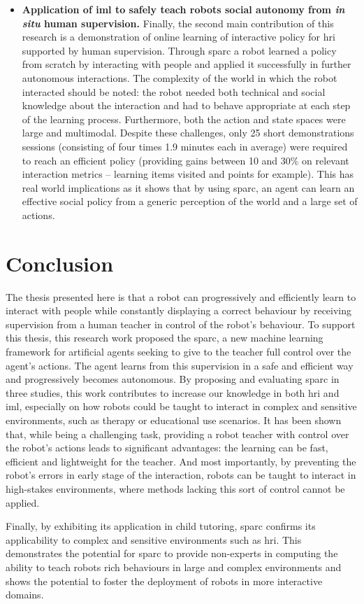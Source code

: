 \begin{itemize}
	\item \textbf{Application of \gls{iml} to safely teach robots social autonomy from \textit{in situ} human supervision.} Finally, the second main contribution of this research is a demonstration of online learning of interactive policy for \gls{hri} supported by human supervision. Through \gls{sparc} a robot learned a policy from scratch by interacting with people and applied it successfully in further autonomous interactions. The complexity of the world in which the robot interacted should be noted: the robot needed both technical and social knowledge about the interaction and had to behave appropriate at each step of the learning process. Furthermore, both the action and state spaces were large and multimodal. Despite these challenges, only 25 short demonstrations sessions (consisting of four times 1.9 minutes each in average) were required to reach an efficient policy (providing gains between 10 and 30\% on relevant interaction metrics -- learning items visited and points for example). This has real world implications as it shows that by using \gls{sparc}, an agent can learn an effective social policy from a generic perception of the world and a large set of actions. 
	
\end{itemize}

\section{Conclusion}\label{sec:conc_conc}

The thesis presented here is that a robot can progressively and efficiently learn to interact with people while constantly displaying a correct behaviour by receiving supervision from a human teacher in control of the robot's behaviour.
To support this thesis, this research work proposed the \acrfull{sparc}, a new machine learning framework for artificial agents seeking to give to the teacher full control over the agent's actions. The agent learns from this supervision in a safe and efficient way and progressively becomes autonomous. By proposing and evaluating \gls{sparc} in three studies, this work contributes to increase our knowledge in both \gls{hri} and \gls{iml}, especially on how robots could be taught to interact in complex and sensitive environments, such as therapy or educational use scenarios. It has been shown that, while being a challenging task, providing a robot teacher with control over the robot's actions leads to significant advantages: the learning can be fast, efficient and lightweight for the teacher. And most importantly, by preventing the robot's errors in early stage of the interaction, robots can be taught to interact in high-stakes environments, where methods lacking this sort of control cannot be applied.

Finally, by exhibiting its application in child tutoring, \gls{sparc} confirms its applicability to complex and sensitive environments such as \gls{hri}. This demonstrates the potential for \gls{sparc} to provide non-experts in computing the ability to teach robots rich behaviours in large and complex environments and shows the potential to foster the deployment of robots in more interactive domains.